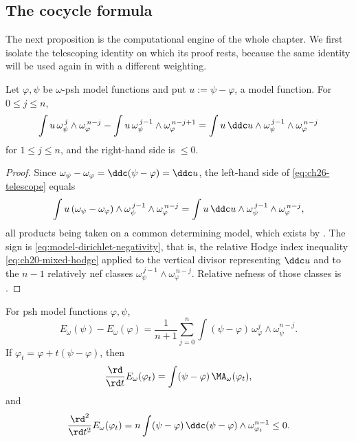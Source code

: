 \subsection{The cocycle formula}
\label{sec:ch26-cocycle}

The next proposition is the computational engine of the whole chapter.  We
first isolate the telescoping identity on which its proof rests, because the
same identity will be used again in  with a different
weighting.

\begin{lemma}
\label{lem:ch26-telescope}
Let \(\varphi,\psi\) be \(\omega\)-psh model functions and put
\(u:=\psi-\varphi\), a model function.  For \(0\leq j\leq n\),
\begin{equation}
\label{eq:ch26-telescope}
 \int u\,\omega_\psi^{\,j}\wedge\omega_\varphi^{\,n-j}
 -\int u\,\omega_\psi^{\,j-1}\wedge\omega_\varphi^{\,n-j+1}
 =\int u\,\ddc u\wedge
   \omega_\psi^{\,j-1}\wedge\omega_\varphi^{\,n-j}
\end{equation}
for \(1\leq j\leq n\), and the right-hand side is \(\leq0\).
\end{lemma}

\begin{proof}
Since \(\omega_\psi-\omega_\varphi=\ddc(\psi-\varphi)=\ddc u\), the left-hand
side of \eqref{eq:ch26-telescope} equals
\[
 \int u\,(\omega_\psi-\omega_\varphi)\wedge
   \omega_\psi^{\,j-1}\wedge\omega_\varphi^{\,n-j}
 =\int u\,\ddc u\wedge
   \omega_\psi^{\,j-1}\wedge\omega_\varphi^{\,n-j},
\]
all products being taken on a common determining model, which exists by
.  The sign is
\eqref{eq:model-dirichlet-negativity}, that is, the relative Hodge index
inequality \eqref{eq:ch20-mixed-hodge} applied to the vertical divisor
representing \(\ddc u\) and to the \(n-1\) relatively nef classes
\(\omega_\psi^{\,j-1}\wedge\omega_\varphi^{\,n-j}\).  Relative nefness of
those classes is .
\end{proof}

\begin{proposition}\label{prop:energy-cocycle}
For psh model functions \(\varphi,\psi\),
\begin{equation}
\label{eq:energy-cocycle}
 E_\omega(\psi)-E_\omega(\varphi)
 =\frac1{n+1}\sum_{j=0}^n
  \int(\psi-\varphi)\,
  \omega_\varphi^j\wedge\omega_\psi^{n-j}.
\end{equation}
If \(\varphi_t=\varphi+t(\psi-\varphi)\), then
\begin{equation}
\label{eq:energy-first-variation}
 \frac{\rd}{\rd t}E_\omega(\varphi_t)
 =\int(\psi-\varphi)\,\MA_\omega(\varphi_t),
\end{equation}
and
\begin{equation}
\label{eq:energy-second-variation}
 \frac{\rd^2}{\rd t^2}E_\omega(\varphi_t)
 =n\int(\psi-\varphi)\,\ddc(\psi-\varphi)
       \wedge\omega_{\varphi_t}^{n-1}\leq0.
\end{equation}
\end{proposition}

